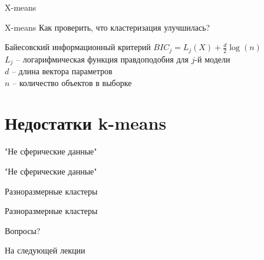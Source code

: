 \documentclass[10pt]{beamer}
\begin{document}
\begin{frame}{X-means}
\end{frame}

\begin{frame}{X-means}
  \centering  
  Как проверить, что кластеризация улучшилась?
\end{frame}

\begin{frame}{Байесовский информационный критерий}
	$BIC_j = L_j(X)  + \frac{d}{2} \log(n)$\\
	\bigbreak
	$L_j$ -- логарифмическая функция правдоподобия для $j$-й модели \\
	$d$ -- длина вектора параметров\\
	$n$ -- количество объектов в выборке\\
\end{frame}

\section{Недостатки k-means}

\begin{frame}{"Не сферические данные"}
\end{frame}	

\begin{frame}{"Не сферические данные"}
\end{frame}

\begin{frame}{Разноразмерные кластеры}
\end{frame}

\begin{frame}{Разноразмерные кластеры}
\end{frame}

\begin{frame}[standout]
  Вопросы?
\end{frame}

\appendix

\begin{frame}{На следующей лекции}
\end{frame}
\end{document}
